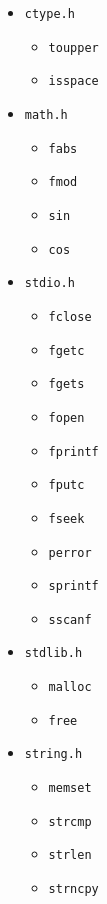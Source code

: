 \documentclass[a4paper, 12pt, titlepage]{article}
\newcommand{\code}[1]{\small\texttt{#1}\normalsize}
\begin{document}
\begin{itemize}[label={--}, noitemsep]
    \item \code{ctype.h}
        \begin{itemize}[label={--}, noitemsep]
            \item \code{toupper}
            \item \code{isspace}
        \end{itemize}
    \item \code{math.h}
        \begin{itemize}[label={--}, noitemsep]
            \item \code{fabs}
            \item \code{fmod}
            \item \code{sin}
            \item \code{cos}
        \end{itemize}
    \item \code{stdio.h}
        \begin{itemize}[label={--}, noitemsep]
            \item \code{fclose}
            \item \code{fgetc}
            \item \code{fgets}
            \item \code{fopen}
            \item \code{fprintf}
            \item \code{fputc}
            \item \code{fseek}
            \item \code{perror}
            \item \code{sprintf}
            \item \code{sscanf}
        \end{itemize}
    \item \code{stdlib.h}
        \begin{itemize}[label={--}, noitemsep]
            \item \code{malloc}
            \item \code{free}
        \end{itemize}
    \item \code{string.h}
        \begin{itemize}[label={--}, noitemsep]
            \item \code{memset}
            \item \code{strcmp}
            \item \code{strlen}
            \item \code{strncpy}
        \end{itemize}
\end{itemize}
\end{document}
